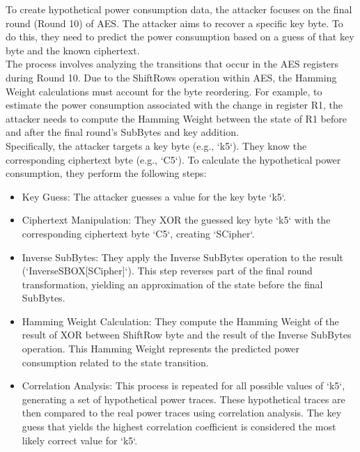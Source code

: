 \documentclass[12pt, letterpaper, oneside]{report}
\begin{document}
To create hypothetical power consumption data, the attacker focuses on the final round 
(Round 10) of AES. The attacker aims to recover a specific key byte. To do this, they need to predict the power consumption based on a guess of that key byte and the known ciphertext.\\

The process involves analyzing the transitions that occur in the AES registers during Round 10. Due to the ShiftRows operation within AES, the Hamming Weight calculations must account for the byte reordering. For example, to estimate the power consumption associated with the change in register R1, the attacker needs to compute the Hamming Weight between the state of R1 before and after the final round's SubBytes and key addition.\\

Specifically, the attacker targets a key byte (e.g., `k5`). They know the corresponding ciphertext byte (e.g., `C5`). To calculate the hypothetical power consumption, they perform the following steps:\\

\begin{itemize}
    \item Key Guess: The attacker guesses a value for the key byte `k5`.
    \item Ciphertext Manipulation: They XOR the guessed key byte `k5` with the corresponding ciphertext byte `C5`, creating `SCipher`.
    \item Inverse SubBytes: They apply the Inverse SubBytes operation to the result \\
    (`InverseSBOX[SCipher]`). 
    This step reverses part of the final round transformation, yielding an approximation of the state before the final SubBytes.
    \item Hamming Weight Calculation: They compute the Hamming Weight of the result of XOR between ShiftRow byte and the result of the Inverse SubBytes operation. This Hamming Weight represents the predicted power consumption related to the state transition.
    \item Correlation Analysis: This process is repeated for all possible values of `k5`, generating a set of hypothetical power traces. These hypothetical traces are then compared to the real power traces using correlation analysis. The key guess that yields the highest correlation coefficient is considered the most likely correct value for `k5`.
\end{itemize}
\end{document}

